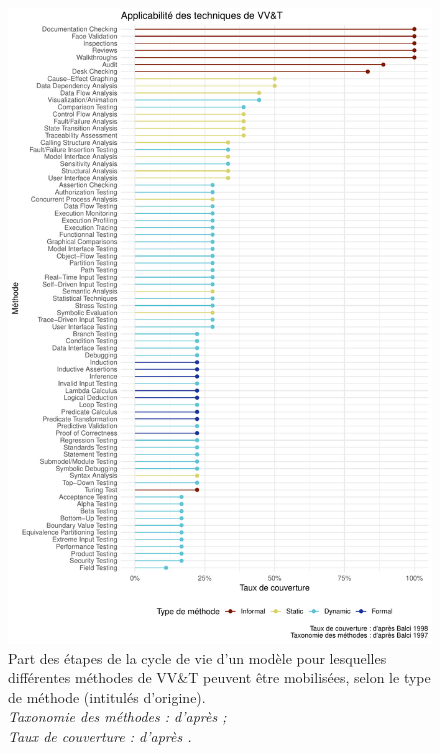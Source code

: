 \begin{figure}[H]
	\includegraphics[width=\linewidth]{img/VVetT_Balci.pdf}
	\caption[Part des étapes de la cycle de vie d'un modèle pour lesquelles différentes méthodes de \og VV\&T\fg{} peuvent être mobilisées.]{Part des étapes de la cycle de vie d'un modèle pour lesquelles différentes méthodes de \og VV\&T\fg{} peuvent être mobilisées, selon le type de méthode (intitulés d'origine).\\
\textit{	Taxonomie des méthodes : d'après \textcite[Figure 2, p. 139]{balci_verification_1997} ; \\
	Taux de couverture : d'après \textcite[Table 3, pp. 45-47]{balci1998verification}.}}
	\label{fig:taxonomy_balci}
\end{figure}

